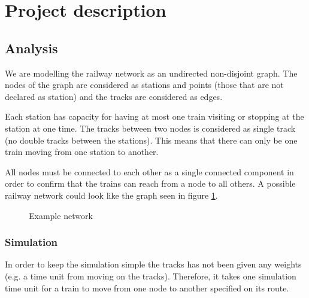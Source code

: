 \documentclass[10pt,a4paper]{article}
\begin{document}
\section{Project description}

\subsection{Analysis}
We are modelling the railway network as an undirected non-disjoint graph. The nodes of the graph are considered as stations and points (those that are not declared as station) and the tracks are considered as edges.
 
Each station has capacity for having at most one train visiting or stopping at the station at one time.
The tracks between two nodes is considered as single track (no double tracks between the stations). This means that there can only be one train moving from one station to another.  
 
All nodes must be connected to each other as a single connected component in order to confirm that the trains can reach from a node to all others.  A possible railway network could look like the graph seen in figure \ref{fig:graph}.

\begin{figure}[h]
\centering
{}
 \caption{Example network}

 \label{fig:graph}
\end{figure}

\subsubsection{Simulation}
 
In order to keep the simulation simple the tracks has not been given any weights (e.g. a time unit from moving on the tracks). Therefore, it takes one simulation time unit for a train to move from one node to another specified on its route.
 
\end{document}
